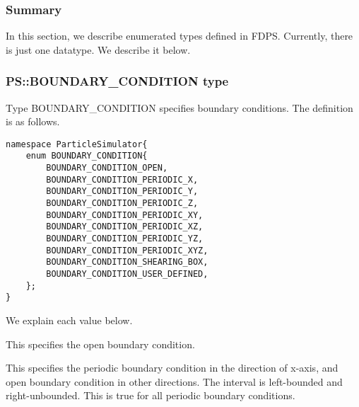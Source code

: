 \subsubsection{Summary}

In this section, we describe enumerated types defined in FDPS.
Currently, there is just one datatype. We describe it below.

\subsubsection{PS::BOUNDARY\_CONDITION type}
\label{sec:datatype_enum_boundarycondition}


Type BOUNDARY\_CONDITION specifies boundary conditions. The definition
is as follows.
\begin{lstlisting}[caption=boundarycondition]
namespace ParticleSimulator{
    enum BOUNDARY_CONDITION{
        BOUNDARY_CONDITION_OPEN,
        BOUNDARY_CONDITION_PERIODIC_X,
        BOUNDARY_CONDITION_PERIODIC_Y,
        BOUNDARY_CONDITION_PERIODIC_Z,
        BOUNDARY_CONDITION_PERIODIC_XY,
        BOUNDARY_CONDITION_PERIODIC_XZ,
        BOUNDARY_CONDITION_PERIODIC_YZ,
        BOUNDARY_CONDITION_PERIODIC_XYZ,
        BOUNDARY_CONDITION_SHEARING_BOX,
        BOUNDARY_CONDITION_USER_DEFINED,
    };
}
\end{lstlisting}

We explain each value below.


This specifies the open boundary condition.


This specifies the periodic boundary condition in the direction of x-axis,
and open boundary condition in other directions. The interval is
left-bounded and right-unbounded. This is true for all periodic
boundary conditions.


